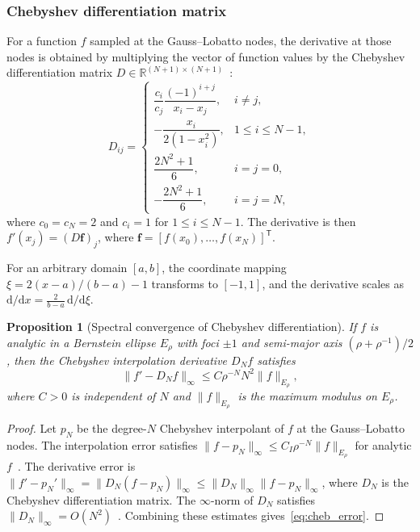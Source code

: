 \documentclass[sn-mathphys,Numbered]{sn-jnl}
\theoremstyle{thmstyleone}
\newtheorem{proposition}[theorem]{Proposition}
\theoremstyle{thmstyletwo}
\theoremstyle{thmstylethree}
\newcommand{\R}{\mathbb{R}}
\newcommand{\dd}{\mathrm{d}}
\newcommand{\T}{\mathsf{T}}
\begin{document}
\subsubsection{Chebyshev differentiation matrix}
For a function $f$ sampled at the Gauss--Lobatto nodes, the derivative at those nodes is obtained by multiplying the vector of function values by the Chebyshev differentiation matrix $D \in \R^{(N+1)\times(N+1)}$~\cite{trefethen2000spectral}:
\begin{equation}
    D_{ij} =
    \begin{cases}
        \dfrac{c_i}{c_j} \dfrac{(-1)^{i+j}}{x_i - x_j}, & i \neq j, \\[6pt]
        -\dfrac{x_i}{2(1-x_i^2)}, & 1 \leq i \leq N-1, \\[6pt]
        \dfrac{2N^2+1}{6}, & i = j = 0, \\[6pt]
        -\dfrac{2N^2+1}{6}, & i = j = N,
    \end{cases}
    \label{eq:cheb_diff_matrix}
\end{equation}
where $c_0 = c_N = 2$ and $c_i = 1$ for $1 \leq i \leq N-1$. The derivative is then $f'(x_j) = (D \mathbf{f})_j$, where $\mathbf{f} = [f(x_0), \ldots, f(x_N)]^\T$.

For an arbitrary domain $[a, b]$, the coordinate mapping $\xi = 2(x-a)/(b-a) - 1$ transforms to $[-1,1]$, and the derivative scales as $\dd/\dd x = \frac{2}{b-a} \, \dd/\dd \xi$.

\begin{proposition}[Spectral convergence of Chebyshev differentiation]\label{prop:cheb_conv}
If $f$ is analytic in a Bernstein ellipse $E_\rho$ with foci $\pm 1$ and semi-major axis $(\rho + \rho^{-1})/2$, then the Chebyshev interpolation derivative $D_N f$ satisfies
\begin{equation}
    \|f' - D_N f\|_\infty \leq C \rho^{-N} N^2 \|f\|_{E_\rho},
    \label{eq:cheb_error}
\end{equation}
where $C > 0$ is independent of $N$ and $\|f\|_{E_\rho}$ is the maximum modulus on $E_\rho$.
\end{proposition}
\begin{proof}
Let $p_N$ be the degree-$N$ Chebyshev interpolant of $f$ at the Gauss--Lobatto nodes. The interpolation error satisfies $\|f-p_N\|_\infty\leq C_I\rho^{-N}\|f\|_{E_\rho}$ for analytic $f$~\cite[Theorem~5.5]{trefethen2000spectral}. The derivative error is $\|f'-p_N'\|_\infty=\|D_N(f-p_N)\|_\infty\leq\|D_N\|_\infty\|f-p_N\|_\infty$, where $D_N$ is the Chebyshev differentiation matrix. The $\infty$-norm of $D_N$ satisfies $\|D_N\|_\infty=O(N^2)$~\cite[Chapter~6]{trefethen2000spectral}. Combining these estimates gives~\eqref{eq:cheb_error}.
\end{proof}
\end{document}
